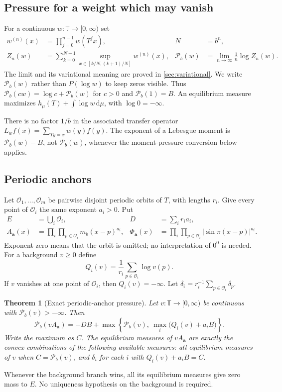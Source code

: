 \documentclass[11pt,a4paper]{article}
\numberwithin{equation}{section}
\newtheorem{theorem}{Theorem}[section]
\theoremstyle{definition}
\theoremstyle{remark}
\newcommand{\TT}{\mathbb T}
\newcommand{\dd}{\,\mathrm d}
\newcommand{\cO}{\mathcal O}
\newcommand{\PP}{\mathcal P}
\begin{document}
\subsection{Pressure for a weight which may vanish}
For a continuous $w\colon\TT\to[0,\infty)$ set
\begin{align}
 w^{(n)}(x)&=\prod_{j=0}^{n-1}w(T^jx), & N&=b^n,\\
 Z_n(w)&=\sum_{k=0}^{N-1}
       \sup_{x\in[k/N,(k+1)/N]}w^{(n)}(x),
 &\PP_b(w)&=\lim_{n\to\infty}\frac1n\log Z_n(w).
 \label{eq:pressure}
\end{align}
The limit and its variational meaning are proved in
\cref{sec:variational}. We write $\PP_b(w)$ rather than $P(\log w)$
to keep zeros visible. Thus $\PP_b(cw)=\log c+\PP_b(w)$ for $c>0$
and $\PP_b(1)=B$. An equilibrium measure maximizes
$h_\mu(T)+\int\log w\dd\mu$, with $\log0=-\infty$.

There is no factor $1/b$ in the associated transfer operator
$L_w f(x)=\sum_{Ty=x}w(y)f(y)$. The exponent of a Lebesgue moment is
$\PP_b(w)-B$, not $\PP_b(w)$, whenever the moment-pressure conversion
below applies.

\subsection{Periodic anchors}
Let $\cO_1,\ldots,\cO_m$ be pairwise disjoint periodic orbits of $T$,
with lengths $r_i$. Give every point of $\cO_i$ the same exponent
$a_i>0$. Put
\begin{align}
 E&=\bigcup_i\cO_i, & D&=\sum_i r_i a_i,\\
 A_{\boldsymbol a}(x)&=\prod_i\prod_{p\in\cO_i}m_b(x-p)^{a_i},
 &\Phi_{\boldsymbol a}(x)&=
       \prod_i\prod_{p\in\cO_i}|\sin\pi(x-p)|^{a_i}.
 \label{eq:anchors}
\end{align}
Exponent zero means that the orbit is omitted; no interpretation of
$0^0$ is needed. For a background $v\ge0$ define
\begin{equation}
 Q_i(v)=\frac1{r_i}\sum_{p\in\cO_i}\log v(p).
 \label{eq:orbit-mean}
\end{equation}
If $v$ vanishes at one point of $\cO_i$, then $Q_i(v)=-\infty$.
Let $\delta_i=r_i^{-1}\sum_{p\in\cO_i}\delta_p$.

\begin{theorem}[Exact periodic-anchor pressure]
\label{thm:pressure}
Let $v\colon\TT\to[0,\infty)$ be continuous with
$\PP_b(v)>-\infty$. Then
\begin{equation}
 \boxed{\quad
 \PP_b(vA_{\boldsymbol a})
 =-DB+\max\left\{\PP_b(v),\ \max_i
                   \bigl(Q_i(v)+a_iB\bigr)\right\}.
 \quad}
 \label{eq:main-pressure}
\end{equation}
Write the maximum as $C$. The equilibrium measures of
$vA_{\boldsymbol a}$ are exactly the convex combinations of the following
available measures: all equilibrium measures of $v$ when $C=\PP_b(v)$,
and $\delta_i$ for each $i$ with $Q_i(v)+a_iB=C$.
\end{theorem}
Whenever the background branch wins, all its equilibrium measures give
zero mass to $E$. No uniqueness hypothesis on the background is required.
\end{document}
